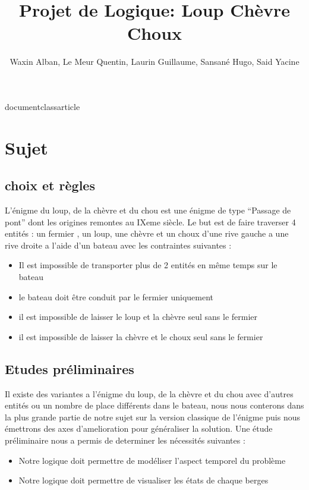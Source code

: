 documentclass{article}
\usepackage{tikz}
\usepackage{fullpage}
\usepackage{amsmath,amsfonts,amssymb,stmaryrd}

\title{Projet de Logique: Loup Chèvre Choux}
\author{Waxin Alban, Le Meur Quentin, Laurin Guillaume, Sansané Hugo, Said Yacine}

\setlength{\topmargin}{-1.5cm}
\setlength{\textheight}{25cm}
\setlength{\textwidth}{18cm}
\setlength{\oddsidemargin}{-1.5cm}
\setlength{\evensidemargin}{50cm}

\newcommand{\R}{\mathbb{R}}
\newcommand{\C}{\mathbb{C}}
\newcommand{\N}{\mathbb{N}}
\newcommand{\Q}{\mathbb{Q}}
\newcommand{\Z}{\mathbb{Z}}
\newcommand{\K}{\mathbb{K}}
\newcommand{\M}{\mathcal{M}}



\maketitle\newpage
\section{Sujet}
\subsection{choix et règles}
L’énigme du loup, de la chèvre et du chou est une énigme de type “Passage de pont” dont les origines remontes au IXeme siècle.
Le but est de faire traverser 4 entités : un fermier , un loup, une chèvre et un choux d’une rive gauche a une rive droite a l’aide d’un bateau avec les contraintes suivantes :

\begin{itemize}
  \item  Il est impossible de transporter plus de 2 entités en même temps sur le bateau
  \item  le bateau doit être conduit par le fermier uniquement
  \item  il est impossible de laisser le loup et la chèvre seul sans le fermier
  \item  il est impossible de laisser la chèvre et le choux seul sans le fermier
\end{itemize}

\subsection{Etudes préliminaires}
Il existe des variantes a l’énigme du loup, de la chèvre et du chou avec d’autres entités ou un nombre de place différents dans le bateau, nous nous conterons dans la plus grande partie de notre sujet sur la version classique de l’énigme puis nous émettrons des axes d’amelioration pour généraliser la solution.
Une étude préliminaire nous a permis de determiner les nécessités suivantes :
\begin{itemize}
  \item Notre logique doit permettre de modéliser l’aspect temporel du problème
  \item Notre logique doit permettre de visualiser les états de chaque berges
\end{itemize}

